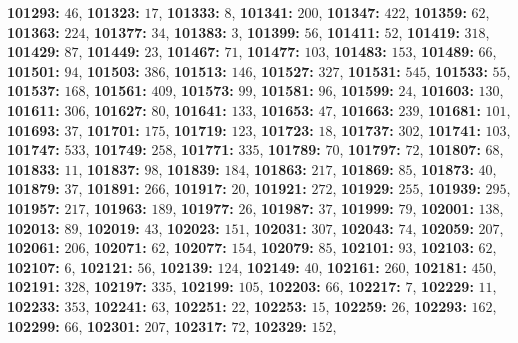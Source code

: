 \textsf{\bfseries 101293:} $46$, \textsf{\bfseries 101323:} $17$, \textsf{\bfseries 101333:} $8$, \textsf{\bfseries 101341:} $200$, \textsf{\bfseries 101347:} $422$, \textsf{\bfseries 101359:} $62$, \textsf{\bfseries 101363:} $224$, \textsf{\bfseries 101377:} $34$, \textsf{\bfseries 101383:} $3$, \textsf{\bfseries 101399:} $56$, \textsf{\bfseries 101411:} $52$, \textsf{\bfseries 101419:} $318$, \textsf{\bfseries 101429:} $87$, \textsf{\bfseries 101449:} $23$, \textsf{\bfseries 101467:} $71$, \textsf{\bfseries 101477:} $103$, \textsf{\bfseries 101483:} $153$, \textsf{\bfseries 101489:} $66$, \textsf{\bfseries 101501:} $94$, \textsf{\bfseries 101503:} $386$, \textsf{\bfseries 101513:} $146$, \textsf{\bfseries 101527:} $327$, \textsf{\bfseries 101531:} $545$, \textsf{\bfseries 101533:} $55$, \textsf{\bfseries 101537:} $168$, \textsf{\bfseries 101561:} $409$, \textsf{\bfseries 101573:} $99$, \textsf{\bfseries 101581:} $96$, \textsf{\bfseries 101599:} $24$, \textsf{\bfseries 101603:} $130$, \textsf{\bfseries 101611:} $306$, \textsf{\bfseries 101627:} $80$, \textsf{\bfseries 101641:} $133$, \textsf{\bfseries 101653:} $47$, \textsf{\bfseries 101663:} $239$, \textsf{\bfseries 101681:} $101$, \textsf{\bfseries 101693:} $37$, \textsf{\bfseries 101701:} $175$, \textsf{\bfseries 101719:} $123$, \textsf{\bfseries 101723:} $18$, \textsf{\bfseries 101737:} $302$, \textsf{\bfseries 101741:} $103$, \textsf{\bfseries 101747:} $533$, \textsf{\bfseries 101749:} $258$, \textsf{\bfseries 101771:} $335$, \textsf{\bfseries 101789:} $70$, \textsf{\bfseries 101797:} $72$, \textsf{\bfseries 101807:} $68$, \textsf{\bfseries 101833:} $11$, \textsf{\bfseries 101837:} $98$, \textsf{\bfseries 101839:} $184$, \textsf{\bfseries 101863:} $217$, \textsf{\bfseries 101869:} $85$, \textsf{\bfseries 101873:} $40$, \textsf{\bfseries 101879:} $37$, \textsf{\bfseries 101891:} $266$, \textsf{\bfseries 101917:} $20$, \textsf{\bfseries 101921:} $272$, \textsf{\bfseries 101929:} $255$, \textsf{\bfseries 101939:} $295$, \textsf{\bfseries 101957:} $217$, \textsf{\bfseries 101963:} $189$, \textsf{\bfseries 101977:} $26$, \textsf{\bfseries 101987:} $37$, \textsf{\bfseries 101999:} $79$, \textsf{\bfseries 102001:} $138$, \textsf{\bfseries 102013:} $89$, \textsf{\bfseries 102019:} $43$, \textsf{\bfseries 102023:} $151$, \textsf{\bfseries 102031:} $307$, \textsf{\bfseries 102043:} $74$, \textsf{\bfseries 102059:} $207$, \textsf{\bfseries 102061:} $206$, \textsf{\bfseries 102071:} $62$, \textsf{\bfseries 102077:} $154$, \textsf{\bfseries 102079:} $85$, \textsf{\bfseries 102101:} $93$, \textsf{\bfseries 102103:} $62$, \textsf{\bfseries 102107:} $6$, \textsf{\bfseries 102121:} $56$, \textsf{\bfseries 102139:} $124$, \textsf{\bfseries 102149:} $40$, \textsf{\bfseries 102161:} $260$, \textsf{\bfseries 102181:} $450$, \textsf{\bfseries 102191:} $328$, \textsf{\bfseries 102197:} $335$, \textsf{\bfseries 102199:} $105$, \textsf{\bfseries 102203:} $66$, \textsf{\bfseries 102217:} $7$, \textsf{\bfseries 102229:} $11$, \textsf{\bfseries 102233:} $353$, \textsf{\bfseries 102241:} $63$, \textsf{\bfseries 102251:} $22$, \textsf{\bfseries 102253:} $15$, \textsf{\bfseries 102259:} $26$, \textsf{\bfseries 102293:} $162$, \textsf{\bfseries 102299:} $66$, \textsf{\bfseries 102301:} $207$, \textsf{\bfseries 102317:} $72$, \textsf{\bfseries 102329:} $152$, 
